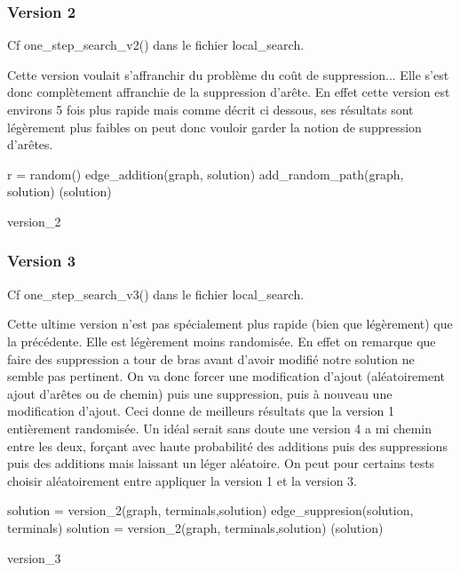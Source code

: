 \documentclass[10pt,a4paper]{article}
\begin{document}
\subsubsection{Version 2}
Cf one\_step\_search\_v2() dans le fichier local\_search.

Cette version voulait s'affranchir du problème du coût de suppression... Elle s'est donc complètement affranchie de la suppression d'arête. En effet cette version est environs 5 fois plus rapide mais comme décrit ci dessous, ses résultats sont légèrement plus faibles on peut donc vouloir garder la notion de suppression d'arêtes.

\begin{algorithm}[H]
\SetAlgoLined
{}
r = random()\;
{
	edge\_addition(graph, solution)\;
}
{
	add\_random\_path(graph, solution)\;
}
\Return(solution)\;
\caption{version\_2}
\end{algorithm}

\subsubsection{Version 3}

Cf one\_step\_search\_v3() dans le fichier local\_search.

Cette ultime version n'est pas spécialement plus rapide (bien que légèrement) que la précédente. Elle est légèrement moins randomisée. En effet on remarque que faire des suppression a tour de bras avant d'avoir modifié notre solution ne semble pas pertinent. On va donc forcer une modification d'ajout (aléatoirement ajout d'arêtes ou de chemin) puis une suppression, puis à nouveau une modification d'ajout. Ceci donne de meilleurs résultats que la version 1 entièrement randomisée. Un idéal serait sans doute une version 4 a mi chemin entre les deux, forçant avec haute probabilité des additions puis des suppressions puis des additions mais laissant un léger aléatoire. On peut pour certains tests choisir aléatoirement entre appliquer la version 1 et la version 3. 

\begin{algorithm}[H]
\SetAlgoLined
{}
solution = version\_2(graph, terminals,solution)\;
edge\_suppresion(solution, terminals)\;
solution = version\_2(graph, terminals,solution)\;
\Return(solution)\;
\caption{version\_3}
\end{algorithm}
\end{document}
